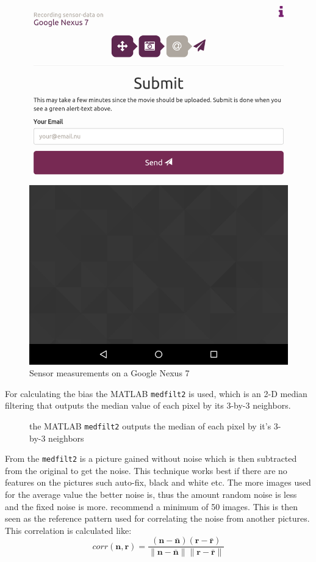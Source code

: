 \begin{figure}[h!]
\begin{minipage}[c]{.23\textwidth}
    \includegraphics[scale=0.15]{img/sensorrec-nexus-4-send}
  \end{minipage}
  \caption{Sensor measurements on a Google Nexus 7}\label{fig:sensorrecCamera}
\end{figure}

For calculating the bias the MATLAB \texttt{medfilt2} is used, which is an 2-D median filtering that outputs the median value of each pixel by its 3-by-3 neighbors. 
\begin{figure}[H]
  \centering
  
  \caption{\label{fig:medfilt2} the MATLAB \texttt{medfilt2} outputs the median of each pixel by it's 3-by-3 neighbors}
\end{figure}
From the \texttt{medfilt2} is a picture gained without noise which is then subtracted from the original to get the noise. This technique works best if there are no features on the pictures such auto-fix, black and white etc. The more images used for the average value the better noise is, thus the amount random noise is less and the fixed noise is more. \cite{sensor:camera:DCIdent} recommend a minimum of 50 images. This is then seen as the reference pattern used for correlating the noise from another pictures. This correlation is calculated like:
$$
corr(\boldsymbol{n},\boldsymbol{r}) = 
\frac{(\boldsymbol{n} - \bar{\boldsymbol{n}})(\boldsymbol{r} - \bar{\boldsymbol{r}})}
{\|\boldsymbol{n} - \bar{\boldsymbol{n}}\| \|\boldsymbol{r} - \bar{\boldsymbol{r}}\|}
$$